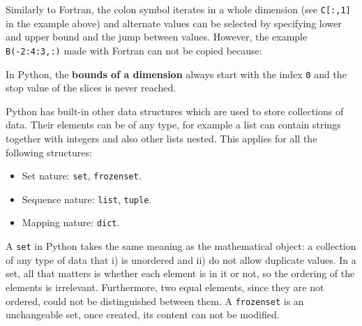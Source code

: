 Similarly to Fortran, the colon symbol iterates in a whole dimension (see \texttt{C[:,1]} in the example above) and 
alternate values can be selected by specifying lower and upper bound and the jump between values.
However, the example \texttt{B(-2:4:3,:)} made with Fortran can not be copied because:
\begin{IN}
In Python, the \textbf{bounds of a dimension} always start with the index \texttt{0} and
the stop value of the slices is never reached. 
\end{IN}









\vspace{0.5cm}
Python has built-in other data structures which are used to store collections of data.
Their elements can be of any type, for example a list can contain strings together with integers and also other lists nested. 
This applies for all the following structures:
\vspace{-.5cm}
\begin{itemize}[noitemsep]    
    \item Set nature: \texttt{set}, \texttt{frozenset}.
    \item Sequence nature: \texttt{list}, \texttt{tuple}.
    \item Mapping nature: \texttt{dict}.
\end{itemize}
\vspace{-.5cm}

A \texttt{set} in Python takes the same meaning as the mathematical object: a collection of any type of data that 
i) is unordered and 
ii) do not allow duplicate values. 
In a set, all that matters is whether each element is in it or not, so the ordering of the elements is irrelevant.
Furthermore, two equal elements, since they are not ordered, could not be distinguished between them. 
A \texttt{frozenset} is an unchangeable set, once created, its content can not be modified. 



